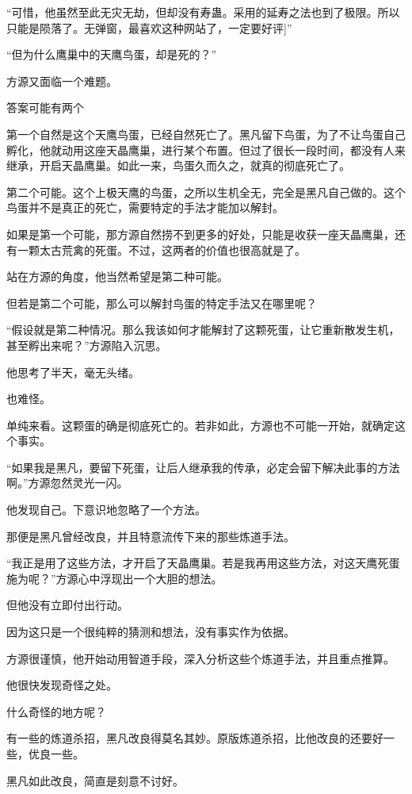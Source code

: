\begin{this_body}
“可惜，他虽然至此无灾无劫，但却没有寿蛊。采用的延寿之法也到了极限。所以只能是陨落了。无弹窗，最喜欢这种网站了，一定要好评]”

“但为什么鹰巢中的天鹰鸟蛋，却是死的？”

方源又面临一个难题。

答案可能有两个

第一个自然是这个天鹰鸟蛋，已经自然死亡了。黑凡留下鸟蛋，为了不让鸟蛋自己孵化，他就动用这座天晶鹰巢，进行某个布置。但过了很长一段时间，都没有人来继承，开启天晶鹰巢。如此一来，鸟蛋久而久之，就真的彻底死亡了。

第二个可能。这个上极天鹰的鸟蛋，之所以生机全无，完全是黑凡自己做的。这个鸟蛋并不是真正的死亡，需要特定的手法才能加以解封。

如果是第一个可能，那方源自然捞不到更多的好处，只能是收获一座天晶鹰巢，还有一颗太古荒禽的死蛋。不过，这两者的价值也很高就是了。

站在方源的角度，他当然希望是第二种可能。

但若是第二个可能，那么可以解封鸟蛋的特定手法又在哪里呢？

“假设就是第二种情况。那么我该如何才能解封了这颗死蛋，让它重新散发生机，甚至孵出来呢？”方源陷入沉思。

他思考了半天，毫无头绪。

也难怪。

单纯来看。这颗蛋的确是彻底死亡的。若非如此，方源也不可能一开始，就确定这个事实。

“如果我是黑凡，要留下死蛋，让后人继承我的传承，必定会留下解决此事的方法啊。”方源忽然灵光一闪。

他发现自己。下意识地忽略了一个方法。

那便是黑凡曾经改良，并且特意流传下来的那些炼道手法。

“我正是用了这些方法，才开启了天晶鹰巢。若是我再用这些方法，对这天鹰死蛋施为呢？”方源心中浮现出一个大胆的想法。

但他没有立即付出行动。

因为这只是一个很纯粹的猜测和想法，没有事实作为依据。

方源很谨慎，他开始动用智道手段，深入分析这些个炼道手法，并且重点推算。

他很快发现奇怪之处。

什么奇怪的地方呢？

有一些的炼道杀招，黑凡改良得莫名其妙。原版炼道杀招，比他改良的还要好一些，优良一些。

黑凡如此改良，简直是刻意不讨好。


\end{this_body}
